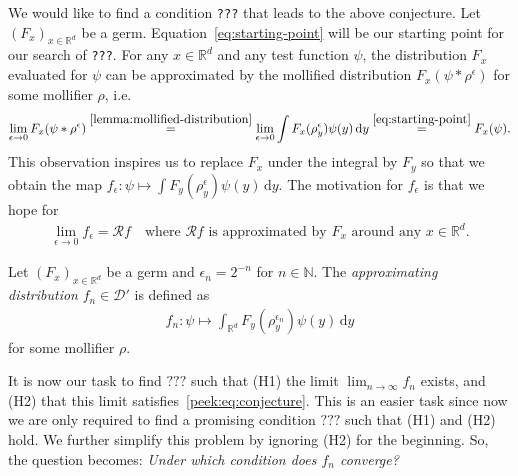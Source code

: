 We would like to find a condition \texttt{???} that leads to the above conjecture. Let \({(F_x)}_{x \in \mathbb{R}^d}\) be a germ. Equation~\eqref{eq:starting-point} will be our starting point for our search of \texttt{???}. For any \(x \in \mathbb{R}^d\) and any test function \({\psi}\), the distribution \(F_x\) evaluated for \({\psi}\) can be approximated by the mollified distribution \(F_x(\psi * \rho^\epsilon)\) for some mollifier \({\rho}\), i.e.
\begin{align*}
    \lim_{\epsilon \to 0}F_x(\psi * \rho^\epsilon) \overset{\eqref{lemma:mollified-distribution}}{=} \lim_{\epsilon \to 0} \int F_x(\rho_y^\epsilon) \psi(y)\, \mathrm{d}y \overset{\eqref{eq:starting-point}}{=} F_x(\psi).
\end{align*}
This observation inspires us to replace \(F_x\) under the integral by \(F_y\) so that we obtain the map \(f_\epsilon: \psi \mapsto \int F_y(\rho_y^\epsilon) \psi(y)\, \mathrm{d}y\). The motivation for \(f_{\epsilon}\) is that we hope for 
\begin{align*}
    \lim_{\epsilon \to 0}f_\epsilon = \mathcal{R}f \quad \text{where } \mathcal{R}f \text{ is approximated by \(F_x\) around any \(x \in \mathbb{R}^d\)}.
\end{align*}
\begin{definition}\label{def:approximating-distributions}
        Let \({(F_x)}_{x \in \mathbb{R}^d}\) be a germ and \(\epsilon_n = 2^{-n}\) for \(n \in \mathbb{N}\). The \emph{approximating distribution} \(f_n \in \mathcal{D}'\) is defined as 
        \begin{align*}
                f_n: \psi \mapsto \int_{\mathbb{R}^d} F_y(\rho_y^{\epsilon_n}) \psi(y)\, \mathrm{d}y
        \end{align*}
        for some mollifier \({\rho}\). 
\end{definition}
It is now our task to find \(\texttt{???}\) such that (H1) the limit \(\lim_{n \to \infty}f_n\) exists, and (H2) that this limit satisfies~\eqref{peek:eq:conjecture}. This is an easier task since now we are only required to find a promising condition \(\texttt{???}\) such that (H1) and (H2) hold. We further simplify this problem by ignoring (H2) for the beginning. So, the question becomes: \emph{Under which condition does \(f_n\) converge?}

